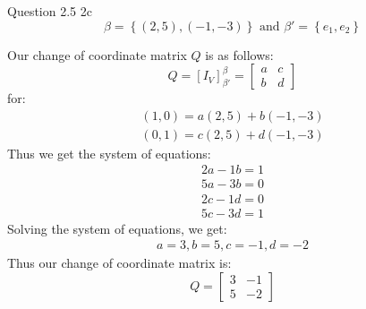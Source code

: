 \documentclass[answers,12pt,addpoints]{exam}
\begin{document}
\begin{questions}
    \question Question 2.5 2c
    $$\beta = \left\{ (2,5), (-1,-3)\right\} \text{ and } \beta' = \left\{ e_1, e_2\right\}$$
    \begin{solution}
        Our change of coordinate matrix $Q$ is as follows:\\
        $$Q = [I_V]_{\beta'}^\beta = \begin{bmatrix}
            a & c\\
            b & d
        \end{bmatrix}$$
        for:
        \begin{align*}
            (1,0) = a(2,5) + b(-1,-3)\\
            (0,1) = c(2,5) + d(-1,-3)
        \end{align*}
        Thus we get the system of equations:
        \begin{align*}
            2a - 1b = 1\\
            5a - 3b = 0\\
            2c - 1d = 0\\
            5c - 3d = 1
        \end{align*}
        Solving the system of equations, we get:
        \begin{align*}
            a = 3, b = 5, c = -1, d = -2
        \end{align*}
        Thus our change of coordinate matrix is:
        $$Q = \begin{bmatrix}
            3 & -1\\
            5 & -2
        \end{bmatrix}$$

    \end{solution}


\end{questions}
\end{document}
